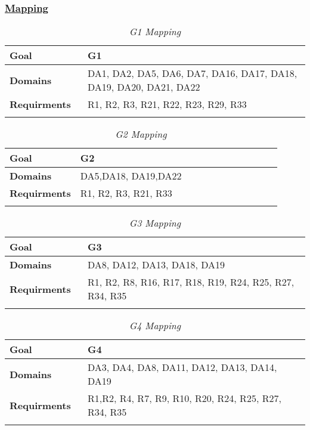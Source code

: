 	\newpage
	
	\subsubsection[Mapping]{\hyperlink{toc}{Mapping}}
		\label{sec:goalSatisfaction}
		
		
			\begin{longtable}{p{0.26\linewidth}p{0.75\linewidth}}
				\toprule
				\textbf{Goal} & G1\\
				\midrule
				\textbf{Domains} & DA1, DA2, DA5, DA6, DA7, DA16, DA17, DA18, DA19, DA20, DA21, DA22\\
				\midrule
				\textbf{Requirments} & R1, R2, R3, R21, R22, R23, R29, R33 \\
				\bottomrule
				\caption{\emph{G1 Mapping}}
			\end{longtable}

			\begin{longtable}{p{0.26\linewidth}p{0.75\linewidth}}
				\toprule
				\textbf{Goal} & G2\\
				\midrule
				\textbf{Domains} & DA5,DA18, DA19,DA22\\
				\midrule
				\textbf{Requirments} & R1, R2, R3, R21, R33 \\
				\bottomrule
				\caption{\emph{G2 Mapping}}
			\end{longtable}
		
			\begin{longtable}{p{0.26\linewidth}p{0.75\linewidth}}
				\toprule
				\textbf{Goal} & G3\\
				\midrule
				\textbf{Domains} & DA8, DA12, DA13, DA18, DA19\\
				\midrule
				\textbf{Requirments} & R1, R2, R8, R16, R17, R18, R19, R24, R25, R27, R34, R35 \\
				\bottomrule
				\caption{\emph{G3 Mapping}}
			\end{longtable}		
		
			\begin{longtable}{p{0.26\linewidth}p{0.75\linewidth}}
				\toprule
				\textbf{Goal} & G4\\
				\midrule
				\textbf{Domains} & DA3, DA4, DA8, DA11, DA12, DA13, DA14, DA19\\
				\midrule
				\textbf{Requirments} & R1,R2, R4, R7, R9, R10, R20, R24, R25, R27, R34, R35 \\
				\bottomrule
				\caption{\emph{G4 Mapping}}
			\end{longtable}		
		
